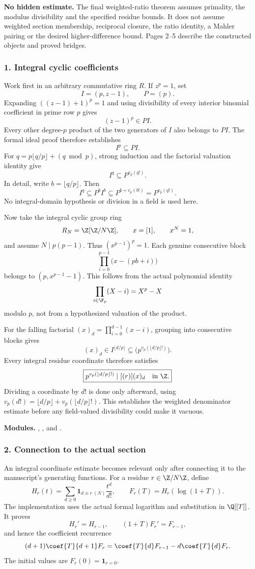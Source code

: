 \textbf{No hidden estimate.} The final weighted-ratio theorem assumes primality, the modulus divisibility and the specified residue bounds. It does not assume weighted section membership, reciprocal closure, the ratio identity, a Mahler pairing or the desired higher-difference bound. Pages 2--5 describe the constructed objects and proved bridges.
\par\medskip
\subsubsection*{1. Integral cyclic coefficients}
Work first in an arbitrary commutative ring $R$. If $z^p=1$, set
\[
 I=(p,z-1),\qquad P=(p).
\]
Expanding $((z-1)+1)^p=1$ and using divisibility of every interior binomial coefficient in prime row $p$ gives
\[
 (z-1)^p\in PI.
\]
Every other degree-$p$ product of the two generators of $I$ also belongs to $PI$. The formal ideal proof therefore establishes
\[
 \boxed{I^p\subseteq PI.}
\]
For $q=p\lfloor q/p\rfloor+(q\bmod p)$, strong induction and the factorial valuation identity give
\[
 \boxed{I^q\subseteq P^{v_p(q!)}}.
\]
In detail, write $b=\lfloor q/p\rfloor$. Then
\[
 I^q\subseteq P^b I^b\subseteq P^{b+v_p(b!)}=P^{v_p(q!)}.
\]
No integral-domain hypothesis or division in a field is used here.

Now take the integral cyclic group ring
\[
 R_N=\Z[\Z/N\Z],\qquad x=[1],\qquad x^N=1,
\]
and assume $N\mid p(p-1)$. Thus $(x^{p-1})^p=1$. Each genuine consecutive block
\[
 \prod_{i=0}^{p-1}\bigl(x-(pb+i)\bigr)
\]
belongs to $(p,x^{p-1}-1)$. This follows from the actual polynomial identity
\[
 \prod_{i\in\F_p}(X-i)=X^p-X
\]
modulo $p$, not from a hypothesized valuation of the product.

For the falling factorial $(x)_d=\prod_{i=0}^{d-1}(x-i)$, grouping into consecutive blocks gives
\[
 (x)_d\in I^{\lfloor d/p\rfloor}
 \subseteq\bigl(p^{v_p(\lfloor d/p\rfloor!)}\bigr).
\]
Every integral residue coordinate therefore satisfies
\[
 \boxed{p^{v_p(\lfloor d/p\rfloor!)}\mid [(r)](x)_d\quad\text{in }\Z.}
\]
Dividing a coordinate by $d!$ is done only afterward, using
$v_p(d!)=\lfloor d/p\rfloor+v_p(\lfloor d/p\rfloor!)$. This establishes the weighted denominator estimate before any field-valued divisibility could make it vacuous.

\textbf{Modules.} , , and .
\par\medskip
\subsubsection*{2. Connection to the actual section}
An integral coordinate estimate becomes relevant only after connecting it to the manuscript's generating functions. For a residue $r\in\Z/N\Z$, define
\[
 H_r(t)=\sum_{d\ge0}\mathbf1_{d\equiv r\ (N)}\frac{t^d}{d!},
 \qquad F_r(T)=H_r(\log(1+T)).
\]
The implementation uses the actual formal logarithm and substitution in $\Q[[T]]$. It proves
\[
 H_r'=H_{r-1},\qquad (1+T)F_r'=F_{r-1},
\]
and hence the coefficient recurrence
\[
 (d+1)\coef{T}{d+1}F_r
 =\coef{T}{d}F_{r-1}-d\coef{T}{d}F_r.
\]
The initial values are $F_r(0)=\mathbf1_{r=0}$.


